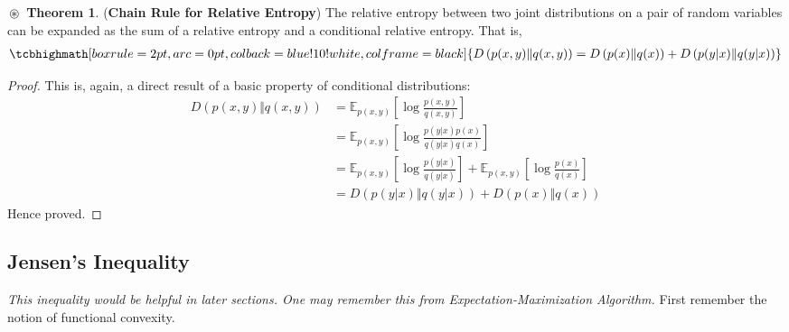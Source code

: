 \documentclass{article}
\theoremstyle{definition}
\newtheorem{theorem}{$\boxed{\boxed{\circledast}}$ Theorem}
\theoremstyle{remark}
\theoremstyle{definition}
\theoremstyle{definition}
\theoremstyle{definition}
\newcommand{\expec}[2]{\mathbb{E}_{#1}\left[ #2\right]}
\newcommand{\given}{\vert}
\newcommand{\KL}[2]{D\left ( #1 \Vert #2\right )}
\newcommand{\theoreq}[1]{
		\tcbhighmath[boxrule=2pt,arc=0pt,colback=blue!10!white,colframe=black]{\begin{aligned}
				#1
		\end{aligned}}}
\begin{document}
\hrulefill
\begin{theorem}
	(\textbf{Chain Rule for Relative Entropy})  The relative entropy between two joint distributions on a pair of random variables can be expanded as the sum of a relative entropy and a conditional relative entropy. That is,
	\begin{equation}
		\theoreq{\KL{p(x,y)}{q(x,y)} = \KL{p(x)}{q(x)} + \KL{p(y\given x)}{q(y\given x)}}
	\end{equation}
\end{theorem}
\begin{proof}
	This is, again, a direct result of a basic property of conditional distributions:
	\begin{equation*}
		\begin{split}
			\KL{p(x,y)}{q(x,y)} &= \expec{p(x,y)}{\log \frac{p(x,y)}{q(x,y)}}\\
			&= \expec{p(x,y)}{\log\frac{p(y\given x) p(x)}{q(y\given x)q(x)}}\\
			&= \expec{p(x,y)}{\log \frac{p(y\given x)}{q(y\given x)}} + \expec{p(x,y)}{\log \frac{p(x)}{q(x)}}\\
			&= \KL{p(y\given x)}{q(y\given x)} + \KL{p(x)}{q(x)}
		\end{split}
	\end{equation*}
Hence proved.
\end{proof}
\hrulefill
\subsection{Jensen's Inequality}
\emph{This inequality would be helpful in later sections. One may remember this from Expectation-Maximization Algorithm.} First remember the notion of functional convexity.
\end{document}
